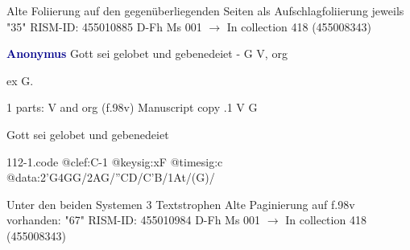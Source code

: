 \documentclass[twocolumn]{book}
\begin{document}
\newline Alte Foliierung auf den gegenüberliegenden Seiten als Aufschlagfoliierung jeweils "35"
\newline RISM-ID: 455010885
\newline D-Fh  Ms 001
\newline $\rightarrow$ In collection 418 (455008343)
      
\newline \par \vspace{7pt} \textcolor{darkblue}{\textbf{Anonymus  }}
\newline Gott sei gelobet und gebenedeiet - G
\newline V, org
\newline \begin{itshape}[f.96r, at left:] ex G.\end{itshape} 
\newline \textcolor{darkblue}{}  1 parts: V and org  (f.98v)
\newline Manuscript copy
.1  V  G
\newline \begin{footnotesize} Gott sei gelobet und gebenedeiet \end{footnotesize}  
\begin{filecontents*}{112-1.code}
@clef:C-1
@keysig:xF
@timesig:c
@data:2'G4GG/2AG/''CD/C'B/1At/(G)/
\end{filecontents*}
\newline
%

\newline Unter den beiden Systemen 3 Textstrophen
\newline Alte Paginierung auf f.98v vorhanden: "67"
\newline RISM-ID: 455010984
\newline D-Fh  Ms 001
\newline $\rightarrow$ In collection 418 (455008343)
      
\end{document}
